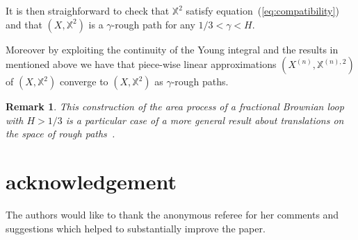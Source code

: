 \documentclass[a4paper,12pt,reqno]{amsart}
\newtheorem{remark}{Remark}
\begin{document}
It is then straighforward to check that $\mathbb{X}^2$ satisfy
 equation~(\ref{eq:compatibility}) and that $(X,\mathbb{X}^2)$ is a
 $\gamma$-rough path for any $1/3 < \gamma < H$.
 
Moreover by exploiting the continuity of the Young integral and the
results in~\cite{coutin} mentioned above we have that piece-wise
linear approximations $(X^{(n)},\mathbb{X}^{(n),2})$ of $(X,\mathbb{X}^2)$
converge to $(X,\mathbb{X}^2)$ as $\gamma$-rough paths.

\begin{remark}
This construction of the area process of a fractional Brownian loop
with $H > 1/3$ is a particular case of a more general result about
translations on the space of rough paths~\cite{LyonsBook,feyel,fv}.
\end{remark}



\section*{acknowledgement}
The authors would like to thank the anonymous referee for her comments
and suggestions which helped to substantially improve the paper.
\end{document}
